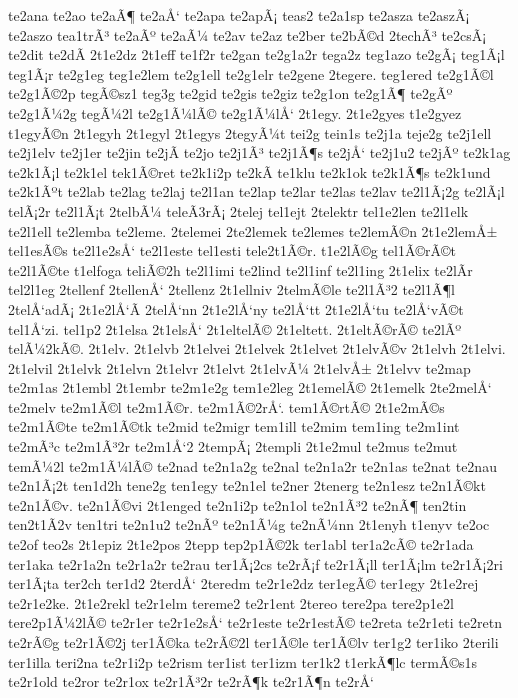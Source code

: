 {te2ana
te2ao
te2aÃ¶
te2aÅ‘
te2apa
te2apÃ¡
teas2
te2a1sp
te2asza
te2aszÃ¡
te2aszo
tea1trÃ³
te2aÃº
te2aÃ¼
te2av
te2az
te2ber
te2bÃ©d
2techÃ³
te2csÃ¡
te2dit
te2dÃ­
2t1e2dz
2t1eff
te1f2r
te2gan
te2g1a2r
tega2z
teg1azo
te2gÃ¡
teg1Ã¡l
teg1Ã¡r
te2g1eg
teg1e2lem
te2g1ell
te2g1elr
te2gene
2tegere.
teg1ered
te2g1Ã©l
te2g1Ã©2p
tegÃ©sz1
teg3g
te2gid
te2gis
te2giz
te2g1on
te2g1Ã¶
te2gÃº
te2g1Ã¼2g
tegÃ¼2l
te2g1Ã¼lÃ©
te2g1Ã¼lÅ‘
2t1egy.
2t1e2gyes
t1e2gyez
t1egyÃ©n
2t1egyh
2t1egyl
2t1egys
2tegyÃ¼t
tei2g
tein1s
te2j1a
teje2g
te2j1ell
te2j1elv
te2j1er
te2jin
te2jÃ­
te2jo
te2j1Ã³
te2j1Ã¶s
te2jÅ‘
te2j1u2
te2jÃº
te2k1ag
te2k1Ã¡l
te2k1el
tek1Ã©ret
te2k1i2p
te2kÃ­
te1klu
te2k1ok
te2k1Ã¶s
te2k1und
te2k1Ãºt
te2lab
te2lag
te2laj
te2l1an
te2lap
te2lar
te2las
te2lav
te2l1Ã¡2g
te2lÃ¡l
telÃ¡2r
te2l1Ã¡t
2telbÃ¼
teleÃ­3rÃ¡
2telej
tel1ejt
2telektr
tel1e2len
te2l1elk
te2l1ell
te2lemba
te2leme.
2telemei
2te2lemek
te2lemes
te2lemÃ©n
2t1e2lemÅ±
tel1esÃ©s
te2l1e2sÅ‘
te2l1este
tel1esti
tele2t1Ã©r.
t1e2lÃ©g
tel1Ã©rÃ©t
te2l1Ã©te
t1elfoga
teliÃ©2h
te2l1imi
te2lind
te2l1inf
te2l1ing
2t1elix
te2lÃ­r
tel2l1eg
2tellenf
2tellenÅ‘
2tellenz
2t1ellniv
2telmÃ©le
te2l1Ã³2
te2l1Ã¶l
2telÅ‘adÃ¡
2t1e2lÅ‘Ã­
2telÅ‘nn
2t1e2lÅ‘ny
te2lÅ‘tt
2t1e2lÅ‘tu
te2lÅ‘vÃ©t
tel1Å‘zi.
tel1p2
2t1elsa
2t1elsÅ‘
2t1eltelÃ©
2t1eltett.
2t1eltÃ©rÃ©
te2lÃº
telÃ¼2kÃ©.
2t1elv.
2t1elvb
2t1elvei
2t1elvek
2t1elvet
2t1elvÃ©v
2t1elvh
2t1elvi.
2t1elvil
2t1elvk
2t1elvn
2t1elvr
2t1elvt
2t1elvÃ¼
2t1elvÅ±
2t1elvv
te2map
te2m1as
2t1embl
2t1embr
te2m1e2g
tem1e2leg
2t1emelÃ©
2t1emelk
2te2melÅ‘
te2melv
te2m1Ã©l
te2m1Ã©r.
te2m1Ã©2rÅ‘.
tem1Ã©rtÃ©
2t1e2mÃ©s
te2m1Ã©te
te2m1Ã©tk
te2mid
te2migr
tem1ill
te2mim
tem1ing
te2m1int
te2mÃ³c
te2m1Ã³2r
te2m1Å‘2
2tempÃ¡
2templi
2t1e2mul
te2mus
te2mut
temÃ¼2l
te2m1Ã¼lÃ©
te2nad
te2n1a2g
te2nal
te2n1a2r
te2n1as
te2nat
te2nau
te2n1Ã¡2t
ten1d2h
tene2g
ten1egy
te2n1el
te2ner
2tenerg
te2n1esz
te2n1Ã©kt
te2n1Ã©v.
te2n1Ã©vi
2t1enged
te2n1i2p
te2n1ol
te2n1Ã³2
te2nÃ¶
ten2tin
ten2t1Ã­2v
ten1tri
te2n1u2
te2nÃº
te2n1Ã¼g
te2nÃ¼nn
2t1enyh
t1enyv
te2oc
te2of
teo2s
2t1epiz
2t1e2pos
2tepp
tep2p1Ã©2k
ter1abl
ter1a2cÃ©
te2r1ada
ter1aka
te2r1a2n
te2r1a2r
te2rau
ter1Ã¡2cs
te2rÃ¡f
te2r1Ã¡ll
ter1Ã¡lm
te2r1Ã¡2ri
ter1Ã¡ta
ter2ch
ter1d2
2terdÅ‘
2teredm
te2r1e2dz
ter1egÃ©
ter1egy
2t1e2rej
te2r1e2ke.
2t1e2rekl
te2r1elm
tereme2
te2r1ent
2tereo
tere2pa
tere2p1e2l
tere2p1Ã¼2lÃ©
te2r1er
te2r1e2sÅ‘
te2r1este
te2r1estÃ©
te2reta
te2r1eti
te2retn
te2rÃ©g
te2r1Ã©2j
ter1Ã©ka
te2rÃ©2l
ter1Ã©le
ter1Ã©lv
ter1g2
ter1iko
2terili
ter1illa
teri2na
te2r1i2p
te2rism
ter1ist
ter1izm
ter1k2
t1erkÃ¶lc
termÃ©s1s
te2r1old
te2ror
te2r1ox
te2r1Ã³2r
te2rÃ¶k
te2r1Ã¶n
te2rÅ‘
}
